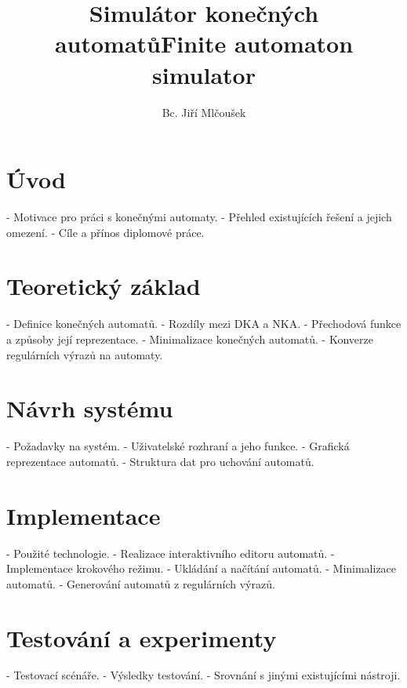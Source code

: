 \documentclass[
  master,
  program=ainfvs,
  biblatex,
  figures=false,
  glossaries,
  index
]{kidiplom}
\title{Simulátor konečných automatů}
\title[english]{Finite automaton simulator}
\author{Bc. Jiří Mlčoušek}
\begin{document}
\maketitle



\section{Úvod}
- Motivace pro práci s konečnými automaty.
- Přehled existujících řešení a jejich omezení.
- Cíle a přínos diplomové práce.

\section{Teoretický základ}
- Definice konečných automatů.
- Rozdíly mezi DKA a NKA.
- Přechodová funkce a způsoby její reprezentace.
- Minimalizace konečných automatů.
- Konverze regulárních výrazů na automaty.

\section{Návrh systému}
- Požadavky na systém.
- Uživatelské rozhraní a jeho funkce.
- Grafická reprezentace automatů.
- Struktura dat pro uchování automatů.

\section{Implementace}
- Použité technologie.
- Realizace interaktivního editoru automatů.
- Implementace krokového režimu.
- Ukládání a načítání automatů.
- Minimalizace automatů.
- Generování automatů z regulárních výrazů.

\section{Testování a experimenty}
- Testovací scénáře.
- Výsledky testování.
- Srovnání s jinými existujícími nástroji.
\end{document}
